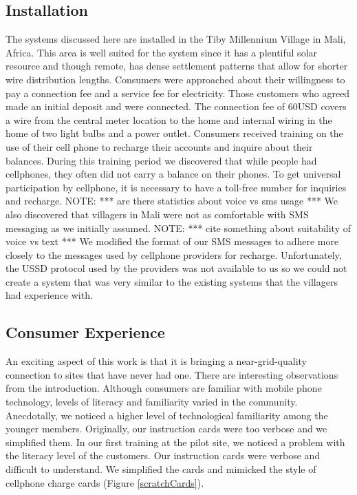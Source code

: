 \documentclass[conference]{IEEEtran}
\newcommand{\note}[1]{{\color{red} NOTE: *** #1 ***}}
\begin{document}
\subsection{Installation}
The systems discussed here are installed in the Tiby Millennium Village
in Mali, Africa.  This area is well suited for the system since it has
a plentiful solar resource and though remote, has dense settlement 
patterns that allow for shorter wire distribution lengths.  Consumers were 
approached about their willingness to pay a connection fee and a service
fee for electricity.  Those customers who agreed made an initial deposit 
and were connected.  
The connection fee of 60USD covers a wire from the central meter location
to the home and internal wiring in the home of two light bulbs and a 
power outlet.  Consumers received training on the use of their cell phone
to recharge their accounts and inquire about their balances.  
During this 
training period we discovered that while people had cellphones, they often
did not carry a balance on their phones.  To get universal participation
by cellphone, it is necessary to have a toll-free number for inquiries
and recharge.  
\note{are there statistics about voice vs sms usage}
We also discovered that villagers in Mali were not as comfortable 
with SMS messaging as we initially assumed.  \note{cite something about
suitability of voice vs text}  We modified the format of our
SMS messages to adhere more closely to the messages used by cellphone 
providers for recharge.  Unfortunately, the USSD protocol used by the
providers was not available to us so we could not create a system that was
very similar to the existing systems that the villagers had experience with.

\subsection{Consumer Experience}
An exciting aspect of this work is that it is bringing a near-grid-quality
connection to sites that have never had one.  
There are interesting observations from
the introduction.  Although consumers are familiar with mobile phone technology,
levels of literacy and familiarity varied in the community.  Anecdotally, we 
noticed a higher level of technological familiarity among the younger members.
Originally, our instruction cards were too verbose and we simplified them.
In our first training at the pilot site, we noticed a problem with the 
literacy level of the customers.  Our instruction cards were verbose and 
difficult to understand.  We simplified the cards and mimicked 
the style of cellphone charge cards (Figure \ref{scratchCards}).
\end{document}
